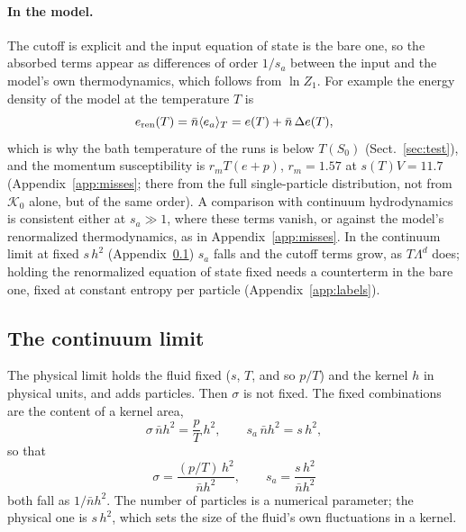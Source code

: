 \documentclass[11pt,aps,preprint,nofootinbib,superscriptaddress,tightenlines]{revtex4-2}
\newcommand{\avg}[1]{\langle #1\rangle}
\def\st{\begin{equation}}
\def\stp{\end{equation}}
\def\Sect#1{Sect.~\ref{#1}}
\def\App#1{Appendix~\ref{#1}}
\let\oldparagraph\paragraph
\renewcommand{\paragraph}{\par\bigskip\oldparagraph}
\begin{document}
\paragraph{In the model.}  The cutoff is explicit and the input equation of state is the bare one, so the absorbed terms appear as differences of order $1/s_a$
between the input and the model's own thermodynamics, which follows from $\ln Z_1$.  For example the energy density of the model at the temperature $T$ is
\st
e_{\rm ren}(T)=\bar n\avg{e_a}_T=e(T)+\bar n\,\Delta e(T),
\stp
which is why the bath temperature of the runs is below $T(S_0)$ (\Sect{sec:test}), and the momentum susceptibility is $r_mT(e+p)$, $r_m=1.57$ at $s(T)V=11.7$ (\App{app:misses};
there from the full single-particle distribution, not from $\mathcal K_0$ alone, but of the same order).  A comparison with continuum hydrodynamics is consistent
either at $s_a\gg1$, where these terms vanish, or against the model's renormalized thermodynamics, as in \App{app:misses}.  In the continuum limit at fixed
$s\,h^2$ (\App{app:continuum}) $s_a$ falls and the cutoff terms grow, as $T\Lambda^d$ does; holding the renormalized equation of state fixed needs a
counterterm in the bare one, fixed at constant entropy per particle (\App{app:labels}).

\subsection{The continuum limit}
\label{app:continuum}

The physical limit holds the fluid fixed ($s$, $T$, and so $p/T$) and the kernel $h$ in physical units, and adds particles.  Then $\sigma$ is not
fixed.  The fixed combinations are the content of a kernel area,
\st
\sigma\,\bar nh^2=\frac pT\,h^2,\qquad s_a\,\bar nh^2=s\,h^2,
\stp
so that
\st
\sigma=\frac{(p/T)\,h^2}{\bar nh^2},\qquad s_a=\frac{s\,h^2}{\bar nh^2}
\stp
both fall as $1/\bar nh^2$.  The number of particles is a numerical parameter; the physical one is $s\,h^2$, which sets the size of the fluid's own
fluctuations in a kernel.
\end{document}

